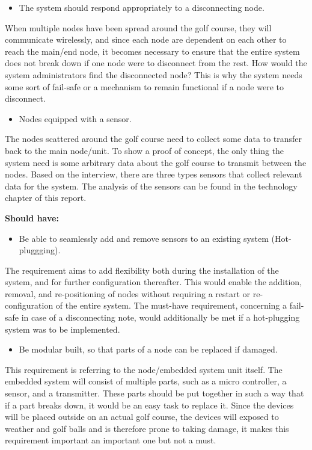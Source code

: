 \begin{itemize}
\item The system should respond appropriately to a disconnecting node.
\end{itemize}
When multiple nodes have been spread around the golf course, they will communicate wirelessly, and since each node are dependent on each other to reach the main/end node, it becomes necessary to ensure that the entire system does not break down if one node were to disconnect from the rest. How would the system administrators find the disconnected node? This is why the system needs some sort of fail-safe or a mechanism to remain functional if a node were to disconnect.


\begin{itemize}
\item Nodes equipped with a sensor.
\end{itemize}
The nodes scattered around the golf course need to collect some data to transfer back to the main node/unit. To show a proof of concept, the only thing the system need is some arbitrary data about the golf course to transmit between the nodes. Based on the interview, there are three types sensors that collect relevant data for the system. The analysis of the sensors can be found in the technology chapter of this report.


\textbf{Should have:}
\begin{itemize}
\item Be able to seamlessly add and remove sensors to an existing system (Hot-pluggging).
\end{itemize}
The requirement aims to add flexibility both during the installation of the system, and for further configuration thereafter. This would enable the addition, removal, and re-positioning of nodes without requiring a restart or re-configuration of the entire system. The must-have requirement, concerning a fail-safe in case of a disconnecting note, would additionally be met if a hot-plugging system was to be implemented.


\begin{itemize}
\item Be modular built, so that parts of a node can be replaced if damaged.
\end{itemize}
This requirement is referring to the node/embedded system unit itself. The embedded system will consist of multiple parts, such as a micro controller, a sensor, and a transmitter. These parts should be put together in such a way that if a part breaks down, it would be an easy task to replace it. Since the devices will be placed outside on an actual golf course, the devices will exposed to weather and golf balls and is therefore prone to taking damage, it makes this requirement important an important one but not a must.


